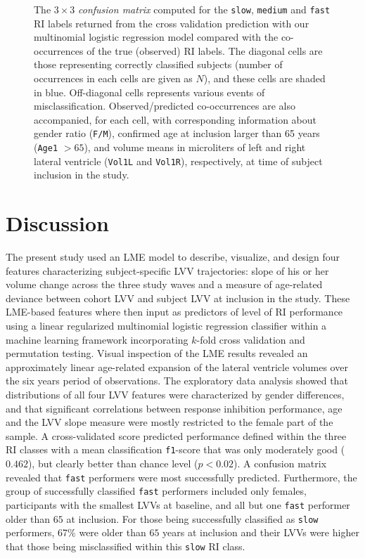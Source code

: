 \documentclass[10pt,letterpaper]{article}
\begin{document}
\vspace{3mm}
\begin{figure}[H]
\caption{
The $3 \times 3$ {\it confusion matrix} 
computed for the {\tt slow}, {\tt medium} and {\tt fast} RI labels returned from the cross validation prediction with our multinomial logistic regression model compared with the co-occurrences of the true (observed) RI labels. The diagonal cells are those representing correctly classified subjects (number of occurrences in each cells are given as $N$), and these cells are shaded in blue. Off-diagonal cells represents various events of misclassification.  Observed/predicted co-occurrences are also accompanied, for each cell, with corresponding information about gender ratio ({\tt F/M}), confirmed age at inclusion larger than 65 years ({\tt Age1} $> 65$), and volume means in microliters of left and right lateral ventricle ({\tt Vol1L} and {\tt Vol1R}), respectively, at time of subject inclusion in the study.}  
\label{fig 7}
\end{figure}
\vspace{3mm}

\section{Discussion}
The present study used an LME model to describe, visualize, and design four features characterizing subject-specific LVV trajectories: slope of his or her volume change across the three study waves and a measure of age-related deviance between cohort LVV and subject LVV at inclusion in the study. These LME-based features where then input as predictors of level of RI performance using a linear regularized multinomial logistic regression classifier within a machine learning framework incorporating $k$-fold cross validation and permutation testing.
Visual inspection of the LME results revealed an approximately linear age-related expansion of the lateral ventricle volumes over the six years period of observations. The exploratory data analysis showed that distributions of all four LVV features were characterized by gender differences, and that significant correlations between response inhibition performance, age and the LVV slope measure were mostly restricted to the female part of the sample.
A cross-validated score predicted performance defined within the three RI classes with a mean classification {\tt f1}-score that was only moderately good ($0.462$), but clearly better than chance level ($p<0.02$). A confusion matrix revealed that {\tt fast} performers were most successfully predicted. Furthermore, the group of successfully classified {\tt fast} performers included only females, participants with the smallest LVVs at baseline, and all but one {\tt fast} performer older than $65$ at inclusion. For those being successfully classified as {\tt slow} performers, 67\% were older than $65$ years at inclusion and their LVVs were higher that those being misclassified within this {\tt slow} RI class.
\end{document}
